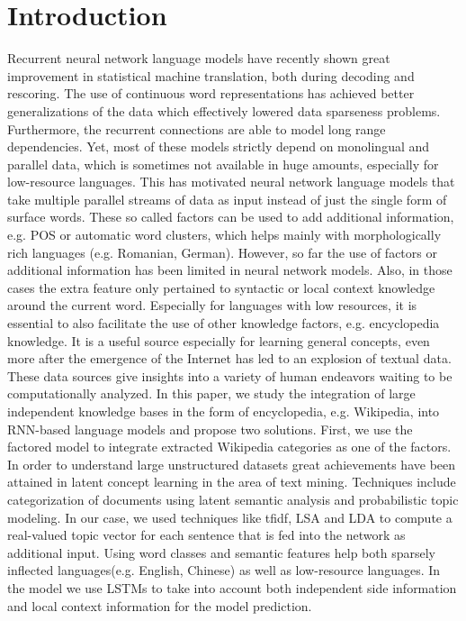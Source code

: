 \documentclass[a4paper]{article}
\begin{document}
\section{Introduction}
Recurrent neural network language models have recently shown great improvement in statistical machine translation, both during decoding and rescoring. The use of continuous word representations has achieved better generalizations of the data which effectively lowered data sparseness problems. Furthermore, the recurrent connections are able to model long range dependencies. Yet, most of these models strictly depend on monolingual and parallel data, which is sometimes not available in huge amounts, especially for low-resource languages.
This has motivated neural network language models that take multiple parallel streams of data as input instead of just the single form of surface words. These so called factors can be used to add additional information, e.g. POS or automatic word clusters, which helps mainly with morphologically rich languages (e.g. Romanian, German). However, so far the use of factors or additional information has been limited in neural network models. Also, in those cases the extra feature only pertained to syntactic or local context knowledge around the current word. Especially for languages with low resources, it is essential to also facilitate the use of other knowledge factors, e.g. encyclopedia knowledge. It is a useful source especially for learning general concepts, even more after the emergence of the Internet has led to an explosion of textual data. These data sources give insights into a variety of human endeavors waiting to be computationally analyzed.
In this paper, we study the integration of large independent knowledge bases in the form of encyclopedia, e.g. Wikipedia, into RNN-based language models and propose two solutions. 
First, we use  the factored model to integrate extracted Wikipedia categories as one of the factors. In order to understand large unstructured datasets great achievements have been attained in latent concept learning in the area of text mining. Techniques include categorization of documents using latent semantic analysis and probabilistic topic modeling. In our case, we used techniques like tfidf, LSA and LDA to compute a real-valued topic vector for each sentence that is fed into the network as additional input. Using word classes and semantic features help both sparsely inflected languages(e.g. English, Chinese) \cite{bilmes2003factored} as well as low-resource languages.
In the model we use LSTMs to take into account both independent side information and local context information for the model prediction.
\end{document}

